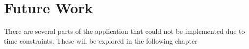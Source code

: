 \documentclass[../../master.tex]{subfiles}
\begin{document}
\chapter{Future Work}
There are several parts of the application that could not be implemented due to time constraints.
These will be explored in the following chapter





\end{document}
